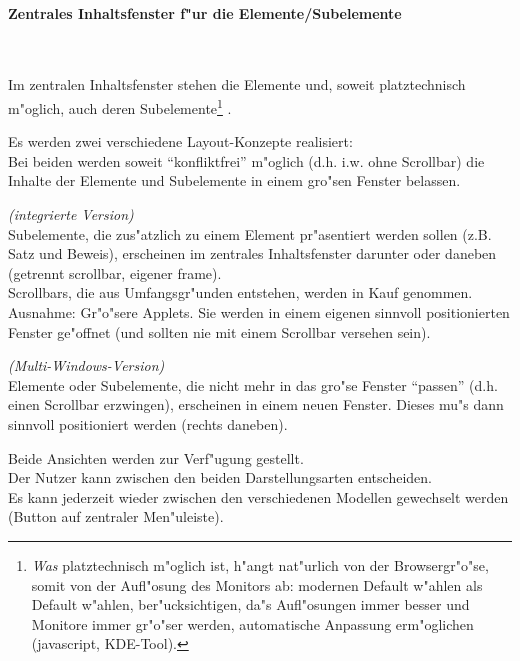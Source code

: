 

\paragraph{Zentrales Inhaltsfenster f"ur die Elemente/Subelemente}\label{zentrales_inhaltsfenster}

\mbox{ }
\vspace{0mm}

Im zentralen Inhaltsfenster stehen die Elemente und, soweit
platztechnisch m"oglich, auch deren Subelemente\footnote{\textit{Was}
platztechnisch m"oglich ist, h"angt nat"urlich von der Browsergr"o"se,
somit von der Aufl"osung des Monitors ab: modernen Default w"ahlen als
Default w"ahlen, ber"ucksichtigen, da"s Aufl"osungen immer besser und
Monitore immer gr"o"ser werden, automatische Anpassung erm"oglichen
(javascript, KDE-Tool).} .

Es werden zwei verschiedene Layout-Konzepte realisiert:\\
Bei beiden werden soweit ``konfliktfrei'' m"oglich (d.h. i.w. ohne Scrollbar)
die Inhalte der Elemente und Subelemente in einem gro"sen
Fenster belassen. 

\begin{list_sabina}\label{single_multi_windows}
	\item \emph{(integrierte Version)}\\\label{integrierte_windows}
	Subelemente, die zus"atzlich zu einem Element pr"asentiert werden 
	sollen (z.B. Satz und Beweis), erscheinen im zentrales Inhaltsfenster
	darunter oder daneben (getrennt scrollbar, eigener frame).\\
	Scrollbars, die aus Umfangsgr"unden entstehen, werden in Kauf 
	genommen.\\
	Ausnahme: Gr"o"sere Applets. Sie werden in einem eigenen sinnvoll
	positionierten Fenster ge"offnet (und sollten nie
	mit einem Scrollbar versehen sein).
	\item \emph{(Multi-Windows-Version)}\\\label{multi_windows}
	Elemente oder Subelemente, die nicht mehr in das gro"se Fenster
	``passen'' (d.h. einen Scrollbar erzwingen), erscheinen in einem
	neuen Fenster. Dieses mu"s dann sinnvoll positioniert werden
	(rechts daneben).
\end{list_sabina}

Beide Ansichten werden zur Verf"ugung gestellt.\\
Der Nutzer kann zwischen den beiden Darstellungsarten entscheiden.\\
Es kann jederzeit wieder zwischen den verschiedenen Modellen
gewechselt werden (Button auf zentraler Men"uleiste).


